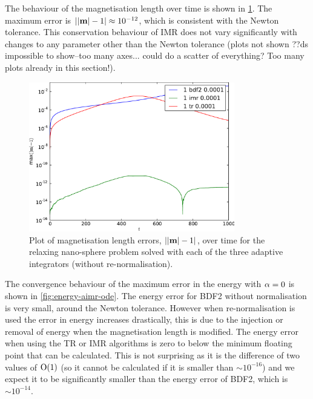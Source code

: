 The behaviour of the magnetisation length over time is shown in \cref{fig:ml-aimr-ode}.
The maximum error is $\left|{\left|{\boldsymbol{\mathrm{m}}} \right| -1} \right| \approx 10^{-12}$, which is consistent with the Newton tolerance.
This conservation behaviour of IMR does not vary significantly with changes to any parameter other than the Newton tolerance (plots not shown ??ds impossible to show--too many axes... could do a scatter of everything? Too many plots already in this section!).

\begin{figure}
  \centering
  \includegraphics[width=0.8\textwidth]{plots/ode_llg_adaptive_ml/mlengtherrormaxesvstimes}
  \caption{Plot of magnetisation length errors, $\left|{\left|{\boldsymbol{\mathrm{m}}} \right| -1} \right|$, over time for the relaxing nano-sphere problem solved with each of the three adaptive integrators (without re-normalisation).}
  \label{fig:ml-aimr-ode}
\end{figure}

The convergence behaviour of the maximum error in the energy with $\alpha = 0$ is shown in \cref{fig:energy-aimr-ode}.
The energy error for BDF2 without normalisation is very small, around the Newton tolerance.
However when re-normalisation is used the error in energy increases drastically, this is due to the injection or removal of energy when the magnetisation length is modified.
The energy error when using the TR or IMR algorithms is zero to below the minimum floating point that can be calculated.
This is not surprising as it is the difference of two values of $\mathrm{O}{\left( 1 \right)}$ (so it cannot be calculated if it is smaller than $\sim 10^{-16}$) and we expect it to be significantly smaller than the energy error of BDF2, which is $\sim 10^{-14}$.

